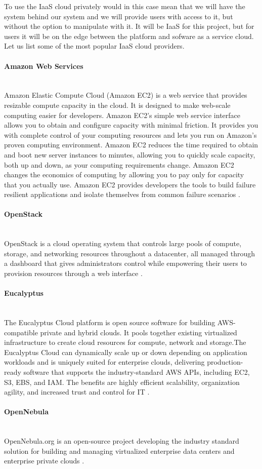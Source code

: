 \documentclass[thesis=B,english]{FITthesis}[2013/04/26]
\newcommand{\myparagraph}[1]{\paragraph{#1}\mbox{}\\}
\begin{document}
To use the IaaS cloud privately would in this case mean that we will have the system behind our system and we will provide users with access to it, but without the option to manipulate with it. It will be IaaS for this project, but for users it will be on the edge between the platform and sofware as a service cloud. Let us list some of the most popular IaaS cloud providers.

\myparagraph{Amazon Web Services}

Amazon Elastic Compute Cloud (Amazon EC2) is a web service that provides resizable compute capacity in the cloud. It is designed to make web-scale computing easier for developers. Amazon EC2’s simple web service interface allows you to obtain and configure capacity with minimal friction. It provides you with complete control of your computing resources and lets you run on Amazon’s proven computing environment. Amazon EC2 reduces the time required to obtain and boot new server instances to minutes, allowing you to quickly scale capacity, both up and down, as your computing requirements change. Amazon EC2 changes the economics of computing by allowing you to pay only for capacity that you actually use. Amazon EC2 provides developers the tools to build failure resilient applications and isolate themselves from common failure scenarios \cite{aws}.

\myparagraph{OpenStack}

OpenStack is a cloud operating system that controls large pools of compute, storage, and networking resources throughout a datacenter, all managed through a dashboard that gives administrators control while empowering their users to provision resources through a web interface \cite{openstack}.

\myparagraph{Eucalyptus}

The Eucalyptus Cloud platform is open source software for building AWS-compatible private and hybrid clouds. It pools together existing virtualized infrastructure to create cloud resources for compute, network and storage.The Eucalyptus Cloud can dynamically scale up or down depending on application workloads and is uniquely suited for enterprise clouds, delivering production-ready software that supports the industry-standard AWS APIs, including EC2, S3, EBS, and IAM. The benefits are highly efficient scalability, organization agility, and increased trust and control for IT \cite{eucalyptus}.

\myparagraph{OpenNebula}

OpenNebula.org is an open-source project developing the industry standard solution for building and managing virtualized enterprise data centers and enterprise private clouds \cite{opennebula}. \\
\end{document}
